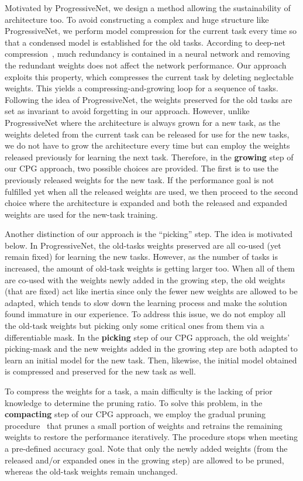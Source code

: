 \documentclass{article}
\begin{document}
Motivated by ProgressiveNet, we design a method allowing the sustainability of architecture too.
To avoid constructing a complex and huge structure like ProgressiveNet, we perform model compression for the current task every time so that a condensed model is established for the old tasks.
According to deep-net compression~\cite{Han16}, much redundancy is contained in a neural network and removing the redundant weights does not affect the network performance.
Our approach exploits this property, which compresses the current task by deleting neglectable weights.
This yields a compressing-and-growing loop for a sequence of tasks.
Following the idea of ProgressiveNet, the weights preserved for the old tasks are set as invariant to avoid forgetting in our approach.
However, unlike ProgressiveNet where the architecture is always grown for a new task, as the weights deleted from the current task can be released for use for the new tasks, we do not have to grow the architecture every time but can employ the weights released previously for learning the next task.
Therefore, in the \textbf{growing} step of our CPG approach, two possible choices are provided.
The first is to use the previously released weights for the new task.
If the performance goal is not fulfilled yet when all the released weights are used, we then proceed to the second choice where the architecture is expanded and both the released and expanded weights are used for the new-task training.

Another distinction of our approach is the ``picking'' step. 
The idea is motivated below.
In ProgressiveNet, the old-tasks weights preserved are all co-used (yet remain fixed) for learning the new tasks.
However, as the number of tasks is increased, the amount of old-task weights is getting larger too.
When all of them are co-used with the weights newly added in the growing step, the old weights (that are fixed) act like inertia since only the fewer new weights are allowed to be adapted, which tends to slow down the learning process and make the solution found immature in our experience. 
To address this issue, we do not employ all the old-task weights but picking only some critical ones from them via a differentiable mask.
In the \textbf{picking} step of our CPG approach, the old weights' picking-mask and the new weights added in the growing step are both adapted to learn an initial model for the new task. Then, likewise, the initial model obtained is compressed and preserved for the new task as well.


To compress the weights for a task, a main difficulty is the lacking of prior knowledge to determine the pruning ratio.
To solve this problem, in the \textbf{compacting} step of our CPG approach, we employ the gradual pruning procedure~\cite{h.2018to} that prunes a small portion of weights and retrains the remaining weights to restore the performance iteratively.
The procedure stops when meeting a pre-defined accuracy goal.
Note that only the newly added weights (from the released and/or expanded ones in the growing step) are allowed to be pruned, whereas the old-task weights remain unchanged.
\end{document}
